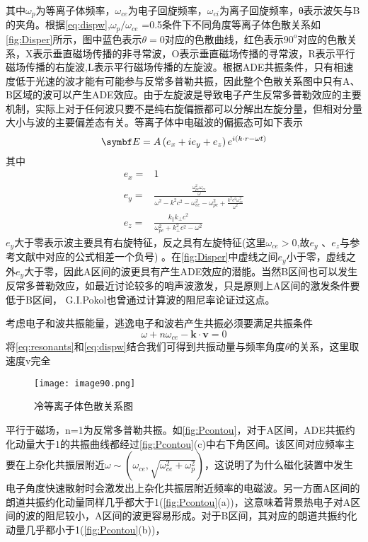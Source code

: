 其中$ω_p$为等离子体频率，$ω_{ce}$为电子回旋频率，$ω_{ci}$为离子回旋频率，θ表示波矢与B的夹角。根据\autoref{eq:dispw},$ω_p/ω_{ce}$ =0.5条件下不同角度等离子体色散关系如\autoref{fig:Disper}所示，图中蓝色表示$θ=0$对应的色散曲线，红色表示$90^o$对应的色散关系，X表示垂直磁场传播的非寻常波，O表示垂直磁场传播的寻常波，R表示平行磁场传播的右旋波,L表示平行磁场传播的左旋波。根据ADE共振条件，只有相速度低于光速的波才能有可能参与反常多普勒共振，因此整个色散关系图中只有A、B区域的波可以产生ADE效应。由于左旋波是导致电子产生反常多普勒效应的主要机制，实际上对于任何波只要不是纯右旋偏振都可以分解出左旋分量，但相对分量大小与波的主要偏差态有关。等离子体中电磁波的偏振态可如下表示\cite{RN1452}
\begin{equation}
\vE=A\left(e_{x}+i e_{y}+e_{z}\right) e^{i(k \cdot r-\omega t)}
\end{equation}
其中
\begin{align}
e_{x}   =& 1 \\
e_{y}  = & \frac{\frac{\omega_{p e}^{2} \omega_{c e}}{\omega}}{\omega^{2}-k^{2} c^{2}-\omega_{c e}^{2}-\omega_{p e}^{2}+\frac{k^{2} c^{2} \omega_{c e}^{2}}{\omega^{2}}} \\
e_{z}  = &\frac{k_{\|} k_{\perp} c^{2}}{\omega_{p e}^{2}+k_{\perp}^{2} c^{2}-\omega^{2}}
\end{align}
$e_y$大于零表示波主要具有右旋特征，反之具有左旋特征(这里$\omega_{c e}>0$,故$e_{y}$ 、$ e_z$与参考文献中对应的公式相差一个负号) 。在\autoref{fig:Disper}中虚线之间$e_y$小于零，虚线之外$e_y$大于零，因此A区间的波更具有产生ADE效应的潜能。当然B区间也可以发生反常多普勒效应，如最近讨论较多的哨声波激发\cite{RN975,RN1815}，只是原则上A区间的激发条件要低于B区间， G.I.Pokol也曾通过计算波的阻尼率论证过这点\cite{RN1757}。\par
考虑电子和波共振能量，逃逸电子和波若产生共振必须要满足共振条件
\begin{equation}\label{eq:resonants}
\omega+n \omega_{c e}-\boldsymbol{k} \cdot \boldsymbol{v}=0
\end{equation}
将\autoref{eq:resonants}和\autoref{eq:dispw}结合我们可得到共振动量与频率角度$\theta$的关系，这里取速度v完全
\begin{figure}[ht]
\centering
\texttt{[image: image90.png]}
\caption{\label{fig:Disper}冷等离子体色散关系图}
\end{figure}
平行于磁场，n=1为反常多普勒共振。如\autoref{fig:Pcontou}，对于A区间，ADE共振约化动量大于1的共振曲线都经过\autoref{fig:Pcontou}(c)中右下角区间。该区间对应频率主要在上杂化共振层附近$\omega \sim\left(\omega_{c e}, \sqrt{\omega_{c e}^{2}+\omega_{p}^{2}}\right)$，这说明了为什么磁化装置中发生电子角度快速散射时会激发出上杂化共振层附近频率的电磁波\cite{RN786,RN1868}。另一方面A区间的朗道共振约化动量同样几乎都大于1(\autoref{fig:Pcontou}(a))，这意味着背景热电子对A区间的波的阻尼较小，A区间的波更容易形成。对于B区间，其对应的朗道共振约化动量几乎都小于1(\autoref{fig:Pcontou}(b))，
